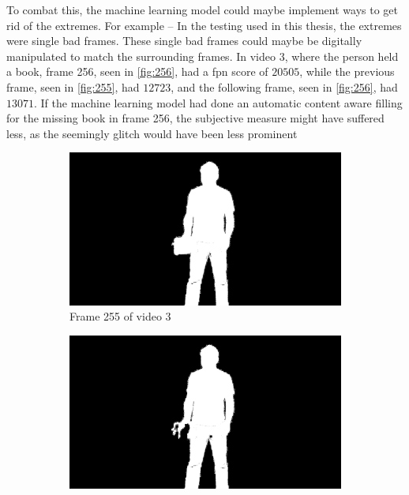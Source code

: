 To combat this, the machine learning model could maybe implement ways to get rid of the extremes. For example – In the testing used in this thesis, the extremes were single bad frames. These single bad frames could maybe be digitally manipulated to match the surrounding frames. In video 3, where the person held a book, frame 256, seen in \autoref{fig:256}, had a \acrlong{fpn} score of $20505$, while the previous frame, seen in \autoref{fig:255}, had $12723$, and the following frame, seen in \autoref{fig:256}, had $13071$. If the machine learning model had done an automatic content aware filling for the missing book in frame 256, the subjective measure might have suffered less, as the seemingly glitch would have been less prominent

\begin{figure}
\centering
\begin{subfigure}{.3\textwidth}
  \centering
  \includegraphics[width=\linewidth]{img/256/FG_Showing-Object_BG_White-Wall_fg_255.jpg}
  \caption{Frame 255 of video 3}
  \label{fig:255}
\end{subfigure}%
\begin{subfigure}{.3\textwidth}
  \centering
  \includegraphics[width=\linewidth]{img/256/FG_Showing-Object_BG_White-Wall_fg_256.jpg}

\end{subfigure}
\end{figure}
